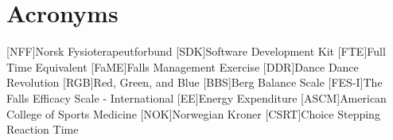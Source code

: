 \chapter*{Acronyms}
\begin{acronym}
[NFF]{Norsk Fysioterapeutforbund}
[SDK]{Software Development Kit}
[FTE]{Full Time Equivalent}
[FaME]{Falls Management Exercise}
[DDR]{Dance Dance Revolution}
[RGB]{Red, Green, and Blue}
[BBS]{Berg Balance Scale}
[FES-I]{The Falls Efficacy Scale - International}
[EE]{Energy Expenditure} 
[ASCM]{American College of Sports Medicine} 
[NOK]{Norwegian Kroner} 
[CSRT]{Choice Stepping Reaction Time} 
\end{acronym}

